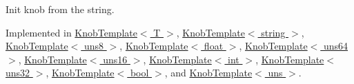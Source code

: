 \label{classabstract__knob__c_ad69620dc8974d5c659c6a7828d460e28}
Init knob from the string. 

Implemented in \hyperlink{classKnobTemplate_a56f3e765c947ac3e63f759d7b3188e42}{KnobTemplate$<$ T $>$}, \hyperlink{classKnobTemplate_3_01string_01_4_ae8fc9c5a7ed9be681b059083338902f7}{KnobTemplate$<$ string $>$}, \hyperlink{classKnobTemplate_a56f3e765c947ac3e63f759d7b3188e42}{KnobTemplate$<$ uns8 $>$}, \hyperlink{classKnobTemplate_a56f3e765c947ac3e63f759d7b3188e42}{KnobTemplate$<$ float $>$}, \hyperlink{classKnobTemplate_a56f3e765c947ac3e63f759d7b3188e42}{KnobTemplate$<$ uns64 $>$}, \hyperlink{classKnobTemplate_a56f3e765c947ac3e63f759d7b3188e42}{KnobTemplate$<$ uns16 $>$}, \hyperlink{classKnobTemplate_a56f3e765c947ac3e63f759d7b3188e42}{KnobTemplate$<$ int $>$}, \hyperlink{classKnobTemplate_a56f3e765c947ac3e63f759d7b3188e42}{KnobTemplate$<$ uns32 $>$}, \hyperlink{classKnobTemplate_a56f3e765c947ac3e63f759d7b3188e42}{KnobTemplate$<$ bool $>$}, and \hyperlink{classKnobTemplate_a56f3e765c947ac3e63f759d7b3188e42}{KnobTemplate$<$ uns $>$}.

